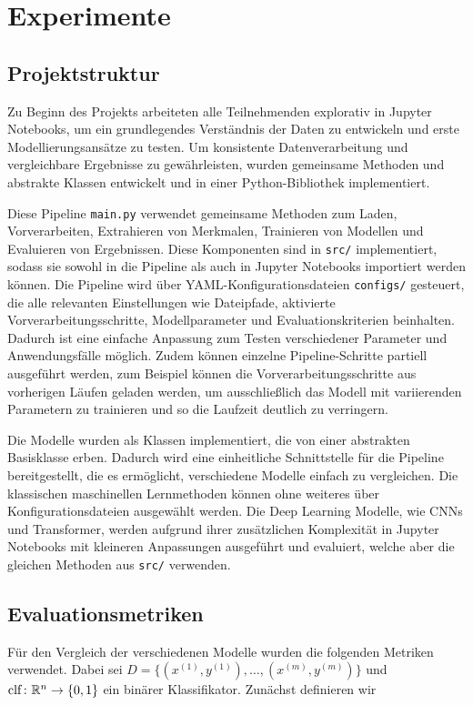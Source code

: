 \section{Experimente}

\subsection{Projektstruktur}
\label{sec:projektstruktur}
Zu Beginn des Projekts arbeiteten alle Teilnehmenden explorativ in Jupyter Notebooks, um ein grundlegendes Verständnis der Daten zu entwickeln und erste Modellierungsansätze zu testen. Um konsistente Datenverarbeitung und vergleichbare Ergebnisse zu gewährleisten, wurden gemeinsame Methoden und abstrakte Klassen entwickelt und in einer Python-Bibliothek implementiert.

Diese Pipeline \texttt{main.py} verwendet gemeinsame Methoden zum Laden, Vorverarbeiten, Extrahieren von Merkmalen, Trainieren von Modellen und Evaluieren von Ergebnissen. Diese Komponenten sind in \texttt{src/} implementiert, sodass sie sowohl in die Pipeline als auch in Jupyter Notebooks importiert werden können. Die Pipeline wird über YAML-Konfigurationsdateien \texttt{configs/} gesteuert, die alle relevanten Einstellungen wie Dateipfade, aktivierte Vorverarbeitungsschritte, Modellparameter und Evaluationskriterien beinhalten. Dadurch ist eine einfache Anpassung zum Testen verschiedener Parameter und Anwendungsfälle möglich. Zudem können einzelne Pipeline-Schritte partiell ausgeführt werden, zum Beispiel können die Vorverarbeitungsschritte aus vorherigen Läufen geladen werden, um ausschließlich das Modell mit variierenden Parametern zu trainieren und so die Laufzeit deutlich zu verringern.

Die Modelle wurden als Klassen implementiert, die von einer abstrakten Basisklasse erben. Dadurch wird eine einheitliche Schnittstelle für die Pipeline bereitgestellt, die es ermöglicht, verschiedene Modelle einfach zu vergleichen. Die klassischen maschinellen Lernmethoden können ohne weiteres über Konfigurationsdateien ausgewählt werden. Die Deep Learning Modelle, wie CNNs und Transformer, werden aufgrund ihrer zusätzlichen Komplexität in Jupyter Notebooks mit kleineren Anpassungen ausgeführt und evaluiert, welche aber die gleichen Methoden aus \texttt{src/} verwenden.

\subsection{Evaluationsmetriken}
Für den Vergleich der verschiedenen Modelle wurden die folgenden Metriken verwendet. Dabei sei $D = \{(x^{(1)}, y^{(1)}), \dots, (x^{(m)}, y^{(m)})\}$ und $\operatorname{clf}\colon\mathbb{R}^n \to \{0, 1\}$ ein binärer Klassifikator. Zunächst definieren wir

